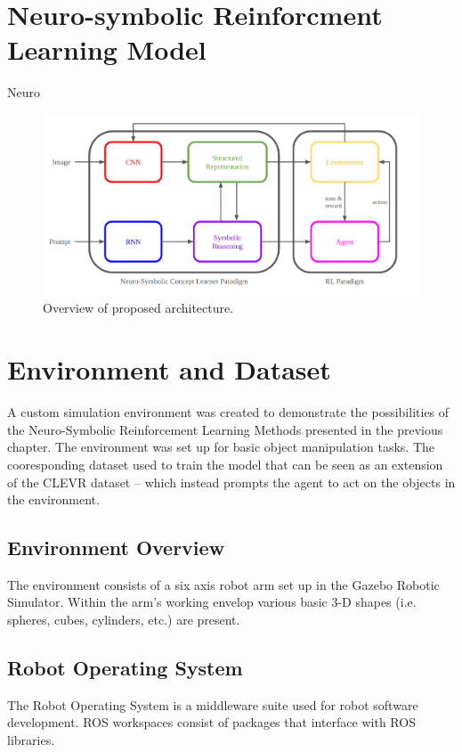 \documentclass[doublespace,draft,nopageskip]{VTthesis} %
\begin{document}
    \chapter{Neuro-symbolic Reinforcment Learning Model}
    Neuro\\
    \begin{figure}[htb]
        \centering
		    \includegraphics[scale=0.25]{./images/architecture_overview}
				\caption{Overview of proposed architecture.} 
			\label{fig:architecture_overview}
	\end{figure}

    \chapter{Environment and Dataset} \label{ch:training_environment}
    A custom simulation environment was created to demonstrate the possibilities of the Neuro-Symbolic Reinforcement Learning Methods presented in the previous chapter. The environment was set up for basic object manipulation tasks. The cooresponding dataset used to train the model that can be seen as an extension of the CLEVR dataset -- which instead prompts the agent to act on the objects in the environment.
    \section{Environment Overview} \label{ch:environment_overview}
    The environment consists of a six axis robot arm set up in the Gazebo Robotic Simulator. Within the arm's working envelop various basic 3-D shapes (i.e. spheres, cubes, cylinders, etc.) are present.
    
    \section{Robot Operating System} \label{se:robot_operating_system}
    The Robot Operating System is a middleware suite used for robot software development.
    ROS workspaces consist of packages that interface with ROS libraries. 
\end{document}
